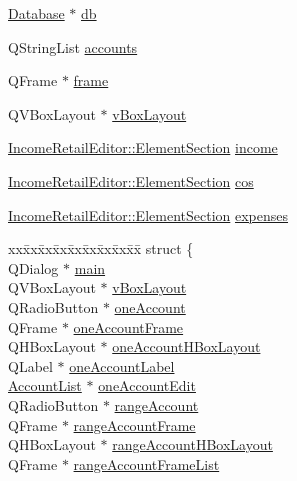 \begin{CompactItemize}
\item 
\hyperlink{classDatabase}{Database} $\ast$ \hyperlink{classIncomeRetailEditor_r0}{db}
\item 
QString\-List \hyperlink{classIncomeRetailEditor_r1}{accounts}
\item 
QFrame $\ast$ \hyperlink{classIncomeRetailEditor_r2}{frame}
\item 
QVBox\-Layout $\ast$ \hyperlink{classIncomeRetailEditor_r3}{v\-Box\-Layout}
\item 
\hyperlink{structIncomeRetailEditor_1_1ElementSection}{Income\-Retail\-Editor::Element\-Section} \hyperlink{classIncomeRetailEditor_r4}{income}
\item 
\hyperlink{structIncomeRetailEditor_1_1ElementSection}{Income\-Retail\-Editor::Element\-Section} \hyperlink{classIncomeRetailEditor_r5}{cos}
\item 
\hyperlink{structIncomeRetailEditor_1_1ElementSection}{Income\-Retail\-Editor::Element\-Section} \hyperlink{classIncomeRetailEditor_r6}{expenses}
\item 
\begin{tabbing}
xx\=xx\=xx\=xx\=xx\=xx\=xx\=xx\=xx\=\kill
struct \{\\
\>QDialog $\ast$ \hyperlink{classIncomeRetailEditor_r7}{main}\\
\>QVBoxLayout $\ast$ \hyperlink{classIncomeRetailEditor_r8}{vBoxLayout}\\
\>QRadioButton $\ast$ \hyperlink{classIncomeRetailEditor_r9}{oneAccount}\\
\>QFrame $\ast$ \hyperlink{classIncomeRetailEditor_r10}{oneAccountFrame}\\
\>QHBoxLayout $\ast$ \hyperlink{classIncomeRetailEditor_r11}{oneAccountHBoxLayout}\\
\>QLabel $\ast$ \hyperlink{classIncomeRetailEditor_r12}{oneAccountLabel}\\
\>\hyperlink{classAccountList}{AccountList} $\ast$ \hyperlink{classIncomeRetailEditor_r13}{oneAccountEdit}\\
\>QRadioButton $\ast$ \hyperlink{classIncomeRetailEditor_r14}{rangeAccount}\\
\>QFrame $\ast$ \hyperlink{classIncomeRetailEditor_r15}{rangeAccountFrame}\\
\>QHBoxLayout $\ast$ \hyperlink{classIncomeRetailEditor_r16}{rangeAccountHBoxLayout}\\
\>QFrame $\ast$ \hyperlink{classIncomeRetailEditor_r17}{rangeAccountFrameList}\\

\end{tabbing}
\end{CompactItemize}
